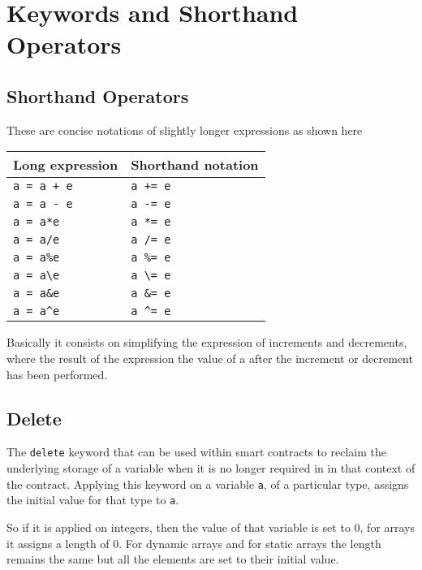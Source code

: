 \section{Keywords and Shorthand
Operators}\label{keywords-and-shorthand-operators}

\subsection{Shorthand Operators}\label{shorthand-operators}

These are concise notations of slightly longer expressions as shown here

\begin{longtable}[]{@{}ll@{}}
\toprule\noalign{}
Long expression & Shorthand notation \\
\midrule\noalign{}
\endhead
\bottomrule\noalign{}
\endlastfoot
\texttt{a\ =\ a\ +\ e} & \texttt{a\ +=\ e} \\
\texttt{a\ =\ a\ -\ e} & \texttt{a\ -=\ e} \\
\texttt{a\ =\ a*e} & \texttt{a\ *=\ e} \\
\texttt{a\ =\ a/e} & \texttt{a\ /=\ e} \\
\texttt{a\ =\ a\%e} & \texttt{a\ \%=\ e} \\
\texttt{a\ =\ a\textbackslash{}\textbar{}e} &
\texttt{a\ \textbackslash{}\textbar{}=\ e} \\
\texttt{a\ =\ a\&e} & \texttt{a\ \&=\ e} \\
\texttt{a\ =\ a\^{}e} & \texttt{a\ \^{}=\ e} \\
\end{longtable}

Basically it consists on simplifying the expression of increments and
decrements, where the result of the expression the value of a after the
increment or decrement has been performed.

\subsection{Delete}\label{delete}

The \texttt{delete} keyword that can be used within smart contracts to
reclaim the underlying storage of a variable when it is no longer
required in in that context of the contract. Applying this keyword on a
variable \texttt{a}, of a particular type, assigns the initial value for
that type to \texttt{a}.

So if it is applied on integers, then the value of that variable is set
to 0, for arrays it assigns a length of 0. For dynamic arrays and for
static arrays the length remains the same but all the elements are set
to their initial value.

